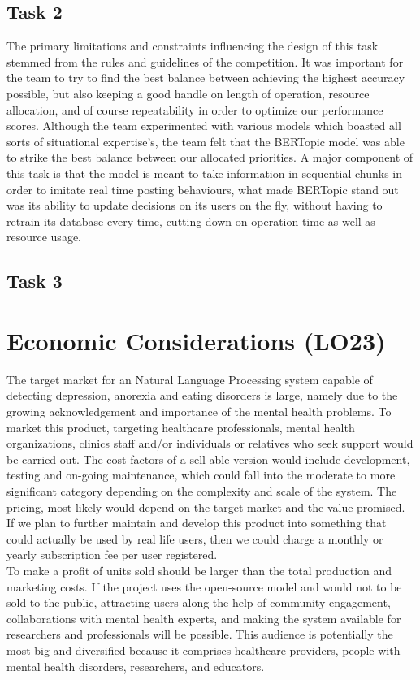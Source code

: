 \documentclass{article}
\begin{document}
\subsection{Task 2}
The primary limitations and constraints influencing the design of this task stemmed from the rules and guidelines of the competition. It was important for the team to try to find the best balance between achieving the highest accuracy possible, but also keeping a good handle on length of operation, resource allocation, and of course repeatability in order to optimize our performance scores. Although the team experimented with various models which boasted all sorts of situational expertise's, the team felt that the BERTopic model was able to strike the best balance between our allocated priorities. A major component of this task is that the model is meant to take information in sequential chunks in order to imitate real time posting behaviours, what made BERTopic stand out was its ability to update decisions on its users on the fly, without having to retrain its database every time, cutting down on operation time as well as resource usage.

\subsection{Task 3}


\section{Economic Considerations (LO23)}

The target market  for an Natural Language Processing system capable of detecting depression, anorexia and eating disorders is large, namely due to the growing acknowledgement and importance of the mental health problems. To market this product, targeting healthcare professionals, mental health organizations, clinics staff and/or individuals or relatives who seek support would be carried out. The cost factors of a sell-able version would include development, testing and on-going maintenance, which could fall into the moderate to more significant category depending on the complexity and scale of the system. The pricing, most likely would depend on the target market and the value promised.  If we plan to further maintain and develop this product into something that could actually be used by real life users, then we could charge a monthly or yearly subscription fee per user registered. \\ To make a profit of units sold should be larger than the total production and marketing costs. If the project uses the open-source model and would not to be sold to the public, attracting users along the help of community engagement, collaborations with mental health experts, and making the system available for researchers and professionals will be possible. This audience is potentially the most big and diversified because it comprises healthcare providers, people with mental health disorders, researchers, and educators.
\end{document}
